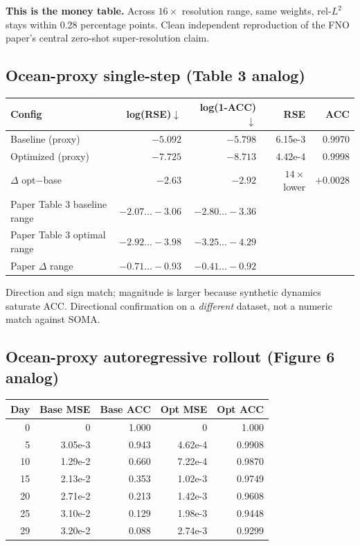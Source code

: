 \documentclass[11pt]{article}
\begin{document}
\textbf{This is the money table.} Across $16\times$ resolution range, same weights, rel-$L^2$
stays within 0.28 percentage points. Clean independent reproduction of the FNO paper's central
zero-shot super-resolution claim.

\subsection{Ocean-proxy single-step (Table 3 analog)}
\begin{center}
\begin{tabular}{lrrrr}
\toprule
Config & log(RSE)$\downarrow$ & log(1-ACC)$\downarrow$ & RSE & ACC \\
\midrule
Baseline (proxy) & $-5.092$ & $-5.798$ & 6.15e-3 & 0.9970 \\
Optimized (proxy) & $-7.725$ & $-8.713$ & 4.42e-4 & 0.9998 \\
$\Delta$ opt$-$base & $-2.63$ & $-2.92$ & $14\times$ lower & $+0.0028$ \\
Paper Table 3 baseline range & $-2.07\ldots-3.06$ & $-2.80\ldots-3.36$ & & \\
Paper Table 3 optimal range & $-2.92\ldots-3.98$ & $-3.25\ldots-4.29$ & & \\
Paper $\Delta$ range & $-0.71\ldots-0.93$ & $-0.41\ldots-0.92$ & & \\
\bottomrule
\end{tabular}
\end{center}

Direction and sign match; magnitude is larger because synthetic dynamics saturate ACC.
Directional confirmation on a \emph{different} dataset, not a numeric match against SOMA.

\subsection{Ocean-proxy autoregressive rollout (Figure 6 analog)}
\begin{center}
\begin{tabular}{rrrrr}
\toprule
Day & Base MSE & Base ACC & Opt MSE & Opt ACC \\
\midrule
0 & 0 & 1.000 & 0 & 1.000 \\
5 & 3.05e-3 & 0.943 & 4.62e-4 & 0.9908 \\
10 & 1.29e-2 & 0.660 & 7.22e-4 & 0.9870 \\
15 & 2.13e-2 & 0.353 & 1.02e-3 & 0.9749 \\
20 & 2.71e-2 & 0.213 & 1.42e-3 & 0.9608 \\
25 & 3.10e-2 & 0.129 & 1.98e-3 & 0.9448 \\
29 & 3.20e-2 & 0.088 & 2.74e-3 & 0.9299 \\
\bottomrule
\end{tabular}
\end{center}
\end{document}
